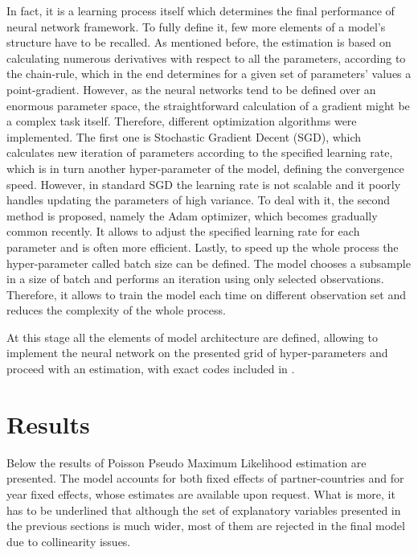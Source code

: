 \documentclass{Trade_template}
\numberwithin{equation}{section}
\begin{document}
In fact, it is a learning process itself which determines the final performance of neural network framework. To fully define it, few more elements of a model’s structure have to be recalled. As mentioned before, the estimation is based on calculating numerous derivatives with respect to all the parameters, according to the chain-rule, which in the end determines for a given set of parameters’ values a point-gradient. However, as the neural networks tend to be defined over an enormous parameter space, the straightforward calculation of a gradient might be a complex task itself. Therefore, different optimization algorithms were implemented. The first one is Stochastic Gradient Decent (SGD), which calculates new iteration of parameters according to the specified learning rate, which is in turn another hyper-parameter of the model, defining the convergence speed. However, in standard SGD the learning rate is not scalable and it poorly handles updating the parameters of high variance. To deal with it, the second method is proposed, namely the Adam optimizer, which becomes gradually common recently. It allows to adjust the specified learning rate for each parameter and is often more efficient. Lastly, to speed up the whole process the hyper-parameter called batch size can be defined. The model chooses a subsample in a size of batch and performs an iteration using only selected observations. Therefore, it allows to train the model each time on different observation set and reduces the complexity of the whole process.

At this stage all the elements of model architecture are defined, allowing to implement the neural network on the presented grid of hyper-parameters and proceed with an estimation, with exact codes included in .

\chapter{Results}

Below the results of Poisson Pseudo Maximum Likelihood estimation are presented.  The model accounts for both fixed effects of partner-countries and for year fixed effects, whose estimates are available upon request. What is more, it has to be underlined that although the set of explanatory variables presented in the previous sections is much wider, most of them are rejected in the final model due to collinearity issues.
\end{document}
